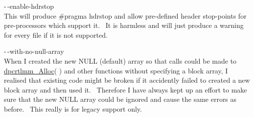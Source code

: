 \documentclass{article}
\begin{document}
\par -$\,$-enable-hdrstop\\
This will produce \#pragma hdrstop and allow pre-defined header
stop-points for pre-processors which support it.~ It is harmless
and will just produce a warning for every file if it is not supported.\\

\par -$\,$-with-no-null-array\\
When I created the new NULL (default) array so that calls could be
made to \href{#Alloc}{dpcrtlmm\_Alloc}( ) and other functions
without
specifying a block array, I realised that existing code might be broken
if it accidently failed to created a new block array and then used
it.~
Therefore I have always kept up an effort to make sure that the new
NULL
array could be ignored and cause the same errors as before.~ This
really is for legacy support only.\\
\end{document}
